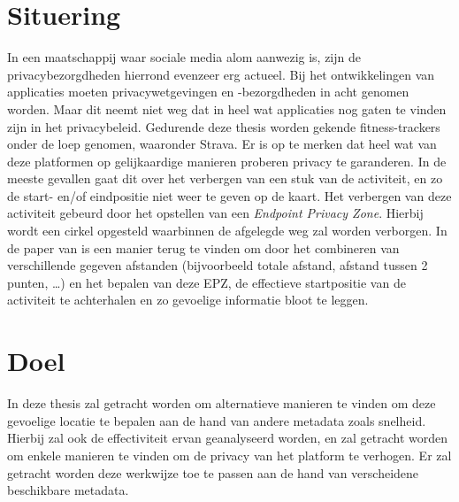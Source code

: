 
\section{Situering}
In een maatschappij waar sociale media alom aanwezig is, zijn de
privacybezorgdheden hierrond evenzeer erg actueel. Bij het ontwikkelingen van
applicaties moeten privacywetgevingen en -bezorgdheden in acht genomen worden.
Maar dit neemt niet weg dat in heel wat applicaties nog gaten te vinden zijn in
het privacybeleid. Gedurende deze thesis worden gekende fitness-trackers onder
de loep genomen, waaronder Strava. Er is op te merken dat heel wat van deze
platformen op gelijkaardige manieren proberen privacy te garanderen. In de
meeste gevallen gaat dit over het verbergen van een stuk van de activiteit, en
zo de start- en/of eindpositie niet weer te geven op de kaart. Het verbergen
van deze activiteit gebeurd door het opstellen van een \textit{Endpoint Privacy
    Zone}. Hierbij wordt een cirkel opgesteld waarbinnen de afgelegde weg zal
worden verborgen. In de paper van
\citeauthor{Dhondt_Pochat_Voulimeneas_Joosen_Volckaert_2022} is een manier
terug te vinden om door het combineren van verschillende gegeven afstanden
(bijvoorbeeld totale afstand, afstand tussen 2 punten, \ldots) en het bepalen
van deze EPZ, de effectieve startpositie van de activiteit te achterhalen en zo
gevoelige informatie bloot te leggen.

\section{Doel}
In deze thesis zal getracht worden om alternatieve manieren te vinden om deze
gevoelige locatie te bepalen aan de hand van andere metadata zoals snelheid.
Hierbij zal ook de effectiviteit ervan geanalyseerd worden, en zal getracht
worden om enkele manieren te vinden om de privacy van het platform te verhogen.
Er zal getracht worden deze werkwijze toe te passen aan de hand van
verscheidene beschikbare metadata.